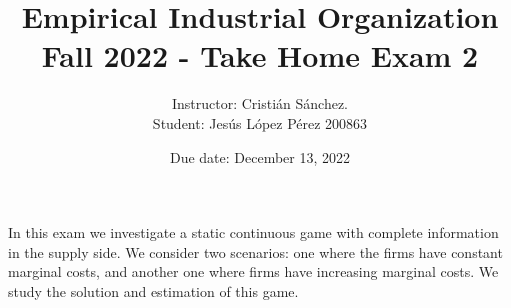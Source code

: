 \documentclass[english,12pt]{article}
\begin{document}
\title{\sc Empirical Industrial Organization\\Fall 2022 - Take Home Exam 2}
\author{Instructor: Cristi\'an S\'anchez. \\ Student: Jes\'us L\'opez P\'erez 200863}
\date{Due date: December 13, 2022}

\maketitle


\bigskip
\bigskip


\noindent In this exam we investigate a static continuous game with complete information in the supply side. We consider two scenarios: one where the firms have constant marginal costs, and another one where firms have increasing marginal costs. We study the solution and estimation of this game.
\end{document}
